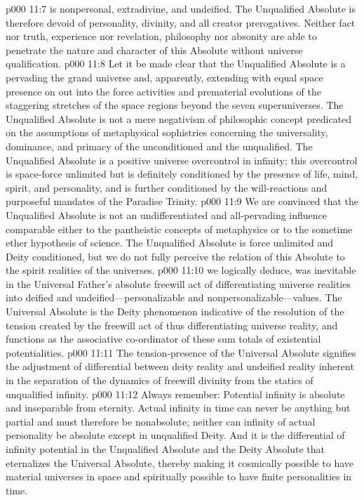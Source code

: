 \vs p000 11:7 \bibnobreakspace {} is nonpersonal, extradivine, and undeified. The Unqualified Absolute is therefore devoid of personality, divinity, and all creator prerogatives. Neither fact nor truth, experience nor revelation, philosophy nor absonity are able to penetrate the nature and character of this Absolute without universe qualification.
\vs p000 11:8 Let it be made clear that the Unqualified Absolute is a  pervading the grand universe and, apparently, extending with equal space presence on out into the force activities and prematerial evolutions of the staggering stretches of the space regions beyond the seven superuniverses. The Unqualified Absolute is not a mere negativism of philosophic concept predicated on the assumptions of metaphysical sophistries concerning the universality, dominance, and primacy of the unconditioned and the unqualified. The Unqualified Absolute is a positive universe overcontrol in infinity; this overcontrol is space\hyp{}force unlimited but is definitely conditioned by the presence of life, mind, spirit, and personality, and is further conditioned by the will\hyp{}reactions and purposeful mandates of the Paradise Trinity.
\vs p000 11:9 We are convinced that the Unqualified Absolute is not an undifferentiated and all\hyp{}pervading influence comparable either to the pantheistic concepts of metaphysics or to the sometime ether hypothesis of science. The Unqualified Absolute is force unlimited and Deity conditioned, but we do not fully perceive the relation of this Absolute to the spirit realities of the universes.
\vs p000 11:10 \bibnobreakspace {} we logically deduce, was inevitable in the Universal Father’s absolute freewill act of differentiating universe realities into deified and undeified---per\-sonalizable and non\-per\-sonalizable---values. The Universal Absolute is the Deity phenomenon indicative of the resolution of the tension created by the freewill act of thus differentiating universe reality, and functions as the associative co\hyp{}ordinator of these sum totals of existential potentialities.
\pc \vs p000 11:11 The tension\hyp{}presence of the Universal Absolute signifies the adjustment of differential between deity reality and undeified reality inherent in the separation of the dynamics of freewill divinity from the statics of unqualified infinity.
\pc \vs p000 11:12 Always remember: Potential infinity is absolute and inseparable from eternity. Actual infinity in time can never be anything but partial and must therefore be nonabsolute; neither can infinity of actual personality be absolute except in unqualified Deity. And it is the differential of infinity potential in the Unqualified Absolute and the Deity Absolute that eternalizes the Universal Absolute, thereby making it cosmically possible to have material universes in space and spiritually possible to have finite personalities in time.
